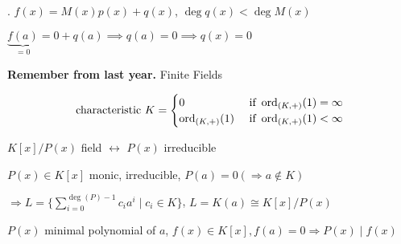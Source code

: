 \Proof.
$f(x) = M(x) p(x) + q(x)$, $\deg q(x) < \deg M(x)$

$\underbrace{f(a)}_{=0} = 0 + q(a) \implies q(a) = 0 \implies q(x) = 0$

\textbf{Remember from last year.}
Finite Fields

\[
  \text{characteristic } K =
  \begin{cases}
    0                & \text{ if } \operatorname{ord}_{(K,+)} (1) = \infty \\
    \operatorname{ord}_{(K,+)} (1) & \text{ if } \operatorname{ord}_{(K,+)} (1) < \infty \\
  \end{cases}
\]

$K[x] / P(x)$ field $\leftrightarrow$ $P(x)$ irreducible

$P(x) \in K[x]$ monic, irreducible, $P(a) = 0 ( \Rightarrow a \not\in K)$

$\Rightarrow L = \{ \sum_{i=0}^{\deg(P)-1} c_i a^i \mid c_i \in K \}$,
$L = K(a) \cong K[x] / P(x)$

$P(x)$ minimal polynomial of $a$, $f(x) \in K[x], f(a) = 0 \Rightarrow P(x)∣f(x)$


